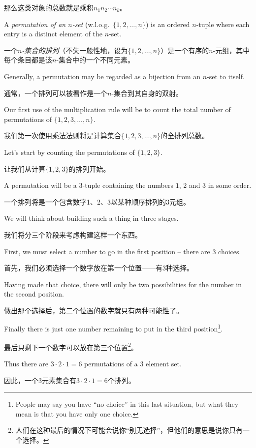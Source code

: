 那么这类对象的总数就是乘积$n_1n_2 \cdots n_k$。

A \emph{permutation of an $n$-set} (w.l.o.g.\ $\{1,2,\ldots , n\}$) is an ordered $n$-tuple where each entry is a distinct element of the
$n$-set.

一个\emph{$n$-集合的排列}（不失一般性地，设为$\{1,2,\ldots , n\}$）是一个有序的$n$-元组，其中每个条目都是该$n$-集合中的一个不同元素。

Generally, a permutation may be regarded as a bijection from
an $n$-set to itself.

通常，一个排列可以被看作是一个$n$-集合到其自身的双射。

Our first use of the multiplication rule will
be to count the total number of permutations of $\{1, 2, 3, \ldots ,n\}$.

我们第一次使用乘法法则将是计算集合$\{1, 2, 3, \ldots ,n\}$的全排列总数。

Let's start by counting the permutations of   $\{1, 2, 3\}$.

让我们从计算$\{1, 2, 3\}$的排列开始。

A permutation will be a 3-tuple containing the numbers $1$, $2$ and
$3$ in some order.

一个排列将是一个包含数字1、2、3以某种顺序排列的3元组。

We will think about building such a thing in 
three stages.

我们将分三个阶段来考虑构建这样一个东西。

First,
we must select a number to go in the first position -- there are $3$ choices.

首先，我们必须选择一个数字放在第一个位置——有3种选择。

Having made that choice, there will only be two possibilities for the number
in the second position.

做出那个选择后，第二个位置的数字就只有两种可能性了。

Finally there is just one number remaining to put in
the third position\footnote{People may say you have ``no choice'' in this %
last situation, but what they mean is that you have only one choice.}.

最后只剩下一个数字可以放在第三个位置\footnote{人们在这种最后的情况下可能会说你“别无选择”，但他们的意思是说你只有一个选择。}。

Thus there are $3\cdot 2\cdot 1 = 6$ permutations of a $3$ element set.

因此，一个3元素集合有$3\cdot 2\cdot 1 = 6$个排列。

